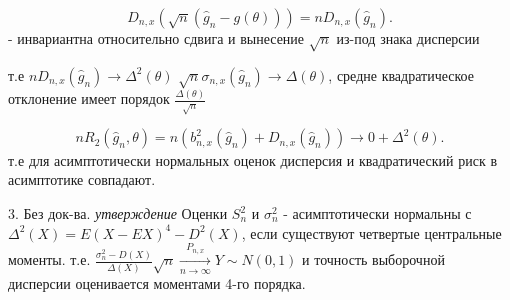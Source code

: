 \[
  D_{n, x}(\sqrt{n}(\hat{g}_n - g(\theta))) = nD_{n, x}(\hat{g}_n)
.\] - инвариантна относительно сдвига и вынесение $\sqrt{n}$ из-под знака дисперсии

т.е $nD_{n, x}(\hat{g}_n) \xrightarrow[]{} \Delta^2(\theta)$
$\sqrt{n}\sigma_{n, x}(\hat{g}_n) \xrightarrow[]{} \Delta(\theta)$, средне квадратическое отклонение имеет порядок $\frac{\Delta(\theta)}{\sqrt{n}}$

\[
  nR_2(\hat{g}_n, \theta) = n(b_{n, x}^2(\hat{g}_n) + D_{n, x}(\hat{g}_n)) \xrightarrow[]{} 0 + \Delta^2(\theta)
.\]
т.е для асимптотически нормальных оценок дисперсия и квадратический риск в асимптотике совпадают.

3. Без док-ва. \textit{утверждение} Оценки $S^2_n$ и $\sigma^2_n$ - асимптотически нормальны с $\Delta^2(X) = E(X - EX)^4 - D^2(X)$, если существуют четвертые центральные моменты.
т.е. $\frac{\sigma^2_n - D(X)}{\Delta(X)}\sqrt{n} \xrightarrow[n \to \infty]{P_{n, x}} Y \sim N(0, 1)$ и точность выборочной дисперсии оценивается моментами 4-го порядка.
